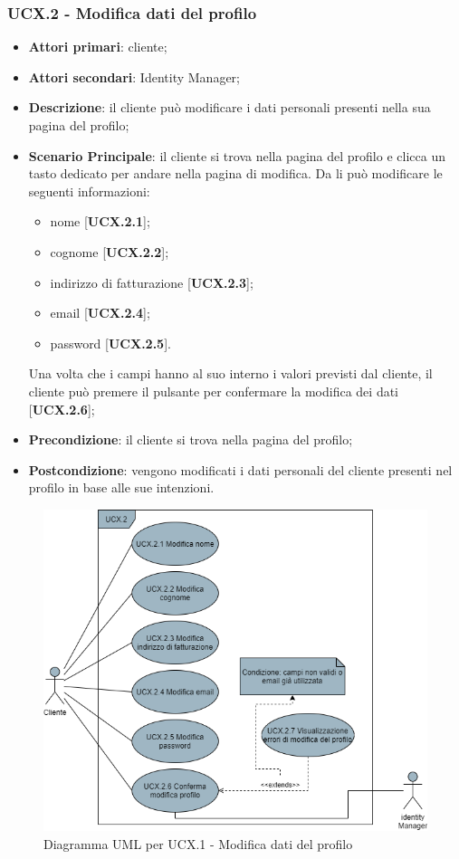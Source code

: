 \subsubsection{UCX.2 - Modifica dati del profilo}
\begin{itemize}
\item \textbf{Attori primari}: cliente;
\item \textbf{Attori secondari}: Identity Manager;
\item \textbf{Descrizione}: il cliente può modificare i dati personali presenti nella sua pagina del profilo;
\item \textbf{Scenario Principale}: il cliente si trova nella pagina del profilo e clicca un tasto dedicato per andare nella pagina di modifica. Da li può modificare le seguenti informazioni:
\begin{itemize}
\item nome [\textbf{UCX.2.1}];
\item cognome [\textbf{UCX.2.2}];
\item indirizzo di fatturazione [\textbf{UCX.2.3}];
\item email [\textbf{UCX.2.4}];
\item password [\textbf{UCX.2.5}].
\end{itemize}
Una volta che i campi hanno al suo interno i valori previsti dal cliente, il cliente può premere il pulsante per confermare la modifica dei dati [\textbf{UCX.2.6}];
\item \textbf{Precondizione}: il cliente si trova nella pagina del profilo;
\item \textbf{Postcondizione}: vengono modificati i dati personali del cliente presenti nel profilo in base alle sue intenzioni.
\end{itemize}

\begin{figure}[H]
\centering
\includegraphics[scale=0.6]{res/UseCase/Immagini/ModificaProfilo}
\caption{Diagramma UML per UCX.1 - Modifica dati del profilo}
\end{figure}

